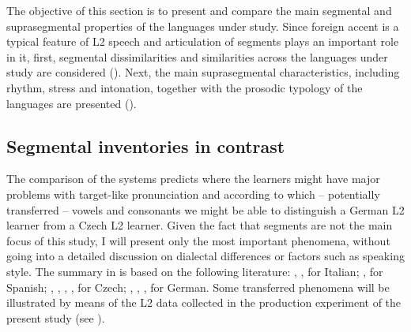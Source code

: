 The objective of this section is to present and compare the main segmental and suprasegmental properties of the languages under study. Since foreign accent is a typical feature of L2 speech and articulation of segments plays an important role in it, first, segmental dissimilarities and similarities across the languages under study are considered (). Next, the main suprasegmental characteristics, including rhythm, stress and intonation, together with the prosodic typology of the languages are presented ().

\subsection{Segmental inventories in contrast}\label{sec:2.3.1} %

The comparison of the systems predicts where the learners might have major problems with target-like pronunciation and according to which -- potentially transferred -- vowels and consonants we might be able to distinguish a German L2 learner from a Czech L2 learner. Given the fact that segments are not the main focus of this study, I will present only the most important phenomena, without going into a detailed discussion on dialectal differences or factors such as speaking style. The summary in  is based on the following literature: \citet{Canepari1992}, \citet{RogersdArcangeli2004}, \citet{LoporcaroBertinetto2005} for Italian; \citet{Hualde2005, Hualde2014}, \citet{GabrielEtAl2013a} for Spanish; \citet{Palková1994}, \citet{Dankovičová1999}, \citet{Volín2010}, \citet{ŠimáckováEtAl2012}, \citet{SkarnitzlEtAl2016} for Czech; \citet{Kohler1995, Kohler1990, Kohler1999}, \citet{Mangold2005}, \citet{Hall2011}, \citet{MeibauerEtAl2015} for German. Some transferred phenomena will be illustrated by means of the L2 data collected in the production experiment of the present study (see ).

